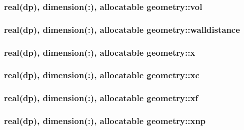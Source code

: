 \hypertarget{classgeometry_a4d57310a2f6f4431e6ec39d9633b3cc5}{
\subsubsection[{vol}]{\setlength{\rightskip}{0pt plus 5cm}real(dp), dimension(\-:), allocatable geometry\-::vol}}\label{classgeometry_a4d57310a2f6f4431e6ec39d9633b3cc5}
\hypertarget{classgeometry_a51893a5f373a1a6c12894eeb216ecc59}{
\subsubsection[{walldistance}]{\setlength{\rightskip}{0pt plus 5cm}real(dp), dimension(\-:), allocatable geometry\-::walldistance}}\label{classgeometry_a51893a5f373a1a6c12894eeb216ecc59}
\hypertarget{classgeometry_addb7458352afb3060d5831f54b39ca61}{
\subsubsection[{x}]{\setlength{\rightskip}{0pt plus 5cm}real(dp), dimension(\-:), allocatable geometry\-::x}}\label{classgeometry_addb7458352afb3060d5831f54b39ca61}
\hypertarget{classgeometry_ab8a1629eea878ff62c7dbd6b6025fc55}{
\subsubsection[{xc}]{\setlength{\rightskip}{0pt plus 5cm}real(dp), dimension(\-:), allocatable geometry\-::xc}}\label{classgeometry_ab8a1629eea878ff62c7dbd6b6025fc55}
\hypertarget{classgeometry_a6be1b0f6e7647b5eea5975c28be87ba3}{
\subsubsection[{xf}]{\setlength{\rightskip}{0pt plus 5cm}real(dp), dimension(\-:), allocatable geometry\-::xf}}\label{classgeometry_a6be1b0f6e7647b5eea5975c28be87ba3}
\hypertarget{classgeometry_afd0076c8984ed089741c40a24b176665}{
\subsubsection[{xnp}]{\setlength{\rightskip}{0pt plus 5cm}real(dp), dimension(\-:), allocatable geometry\-::xnp}}\label{classgeometry_afd0076c8984ed089741c40a24b176665}
